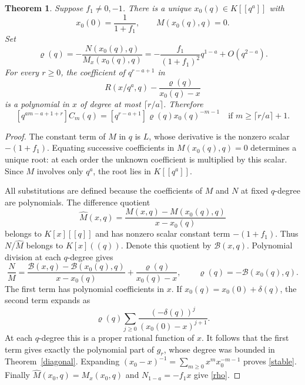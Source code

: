 \documentclass[11pt]{amsart}
\newtheorem{theorem}{Theorem}[section]
\theoremstyle{definition}
\theoremstyle{remark}
\numberwithin{equation}{section}
\begin{document}
\begin{theorem}\label{movingpole}
Suppose $f_1\ne0,-1$. There is a unique $x_0(q)\in K[[q^a]]$ with
\[
 x_0(0)=\frac1{1+f_1},\qquad M(x_0(q),q)=0.
\]
Set
\begin{equation}\label{rho}
 \varrho(q)=-\frac{N(x_0(q),q)}{M_x(x_0(q),q)}
 =-\frac{f_1}{(1+f_1)^2}q^{1-a}+O(q^{2-a}).
\end{equation}
For every $r\ge0$, the coefficient of $q^{r-a+1}$ in
\begin{equation}\label{principalpart}
 R(x/q^a,q)-\frac{\varrho(q)}{x_0(q)-x}
\end{equation}
is a polynomial in $x$ of degree at most $\lceil r/a\rceil$. Therefore
\begin{equation}\label{stable}
 [q^{am-a+1+r}]C_m(q)
 =[q^{r-a+1}]\varrho(q)x_0(q)^{-m-1}
 \quad\text{if }m\ge\lceil r/a\rceil+1.
\end{equation}
\end{theorem}
\begin{proof}
The constant term of $M$ in $q$ is $L$, whose derivative is the nonzero scalar $-(1+f_1)$. Equating successive coefficients in $M(x_0(q),q)=0$ determines a unique root: at each order the unknown coefficient is multiplied by this scalar. Since $M$ involves only $q^a$, the root lies in $K[[q^a]]$.

All substitutions are defined because the coefficients of $M$ and $N$ at fixed $q$-degree are polynomials. The difference quotient
\[
 \widehat M(x,q)=\frac{M(x,q)-M(x_0(q),q)}{x-x_0(q)}
\]
belongs to $K[x][[q]]$ and has nonzero scalar constant term $-(1+f_1)$. Thus $N/\widehat M$ belongs to $K[x]((q))$. Denote this quotient by $\mathcal B(x,q)$. Polynomial division at each $q$-degree gives
\[
 \frac{N}{M}
 =\frac{\mathcal B(x,q)-\mathcal B(x_0(q),q)}{x-x_0(q)}
   +\frac{\varrho(q)}{x_0(q)-x},
 \qquad \varrho(q)=-\mathcal B(x_0(q),q).
\]
The first term has polynomial coefficients in $x$. If $x_0(q)=x_0(0)+\delta(q)$, the second term expands as
\[
 \varrho(q)\sum_{j\ge0}\frac{(-\delta(q))^j}{(x_0(0)-x)^{j+1}}.
\]
At each $q$-degree this is a proper rational function of $x$. It follows that the first term gives exactly the polynomial part of $g_r$, whose degree was bounded in Theorem~\ref{diagonal}. Expanding $(x_0-x)^{-1}=\sum_{m\ge0}x^mx_0^{-m-1}$ proves \eqref{stable}. Finally $\widehat M(x_0,q)=M_x(x_0,q)$ and $N_{1-a}=-f_1x$ give \eqref{rho}.
\end{proof}
\end{document}
